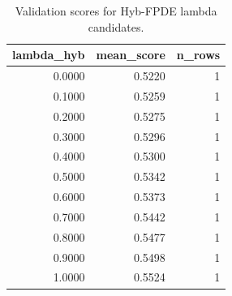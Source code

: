 \begin{table}[t]
\caption{Validation scores for Hyb-FPDE lambda candidates.}
\label{tab:lambda_distribution_computed}
\centering
\begin{tabular}{rrr}
\toprule
lambda\_hyb & mean\_score & n\_rows \\
\midrule
0.0000 & 0.5220 & 1 \\
0.1000 & 0.5259 & 1 \\
0.2000 & 0.5275 & 1 \\
0.3000 & 0.5296 & 1 \\
0.4000 & 0.5300 & 1 \\
0.5000 & 0.5342 & 1 \\
0.6000 & 0.5373 & 1 \\
0.7000 & 0.5442 & 1 \\
0.8000 & 0.5477 & 1 \\
0.9000 & 0.5498 & 1 \\
1.0000 & 0.5524 & 1 \\
\bottomrule
\end{tabular}

\end{table}
